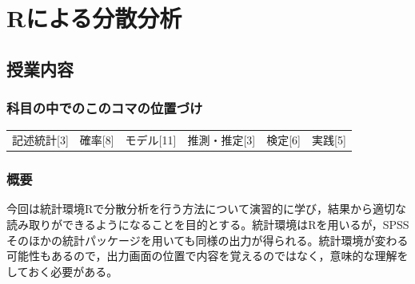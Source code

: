 \section{Rによる分散分析}
\label{s22_anova_onR}

\subsection{授業内容}
\subsubsection{科目の中でのこのコマの位置づけ}
\begin{tabular}[t]{cccccc}
	記述統計[3] & 確率[8] & モデル[11] & 推測・推定[3] & 検定[6] & 実践[5]
\end{tabular}

\subsubsection{概要}
今回は統計環境Rで分散分析を行う方法について演習的に学び，結果から適切な読み取りができるようになることを目的とする。統計環境はRを用いるが，SPSSそのほかの統計パッケージを用いても同様の出力が得られる。統計環境が変わる可能性もあるので，出力画面の位置で内容を覚えるのではなく，意味的な理解をしておく必要がある。
